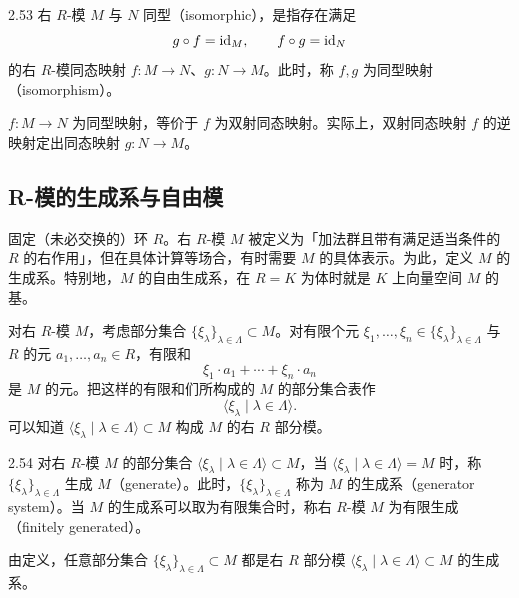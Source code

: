 \begin{definition}{2.53} 右 $R$-模 $M$ 与 $N$ 同型（isomorphic），是指存在满足
\[
  g\circ f=\mathrm{id}_M,\qquad f\circ g=\mathrm{id}_N
\]
的右 $R$-模同态映射 $f\colon M\to N$、$g\colon N\to M$。此时，称 $f,g$ 为同型映射（isomorphism）。\end{definition}

$f\colon M\to N$ 为同型映射，等价于 $f$ 为双射同态映射。实际上，双射同态映射 $f$ 的逆映射定出同态映射 $g\colon N\to M$。


\subsection{R-模的生成系与自由模}

固定（未必交换的）环 $R$。右 $R$-模 $M$ 被定义为「加法群且带有满足适当条件的 $R$ 的右作用」，但在具体计算等场合，有时需要 $M$ 的具体表示。为此，定义 $M$ 的生成系。特别地，$M$ 的自由生成系，在 $R=K$ 为体时就是 $K$ 上向量空间 $M$ 的基。

对右 $R$-模 $M$，考虑部分集合 $\{\xi_\lambda\}_{\lambda\in\Lambda}\subset M$。对有限个元 $\xi_1,\ldots,\xi_n\in\{\xi_\lambda\}_{\lambda\in\Lambda}$ 与 $R$ 的元 $a_1,\ldots,a_n\in R$，有限和
\[
  \xi_1\cdot a_1+\cdots+\xi_n\cdot a_n
\]
是 $M$ 的元。把这样的有限和们所构成的 $M$ 的部分集合表作
\[
  \langle \xi_\lambda \mid \lambda\in\Lambda\rangle .
\]
可以知道 $\langle \xi_\lambda \mid \lambda\in\Lambda\rangle\subset M$ 构成 $M$ 的右 $R$ 部分模。

\begin{definition}{2.54} 对右 $R$-模 $M$ 的部分集合 $\langle \xi_\lambda \mid \lambda\in\Lambda\rangle\subset M$，当 $\langle \xi_\lambda \mid \lambda\in\Lambda\rangle=M$ 时，称 $\{\xi_\lambda\}_{\lambda\in\Lambda}$ 生成 $M$（generate）。此时，$\{\xi_\lambda\}_{\lambda\in\Lambda}$ 称为 $M$ 的生成系（generator system）。当 $M$ 的生成系可以取为有限集合时，称右 $R$-模 $M$ 为有限生成（finitely generated）。\end{definition}

由定义，任意部分集合 $\{\xi_\lambda\}_{\lambda\in\Lambda}\subset M$ 都是右 $R$ 部分模 $\langle \xi_\lambda \mid \lambda\in\Lambda\rangle\subset M$ 的生成系。

